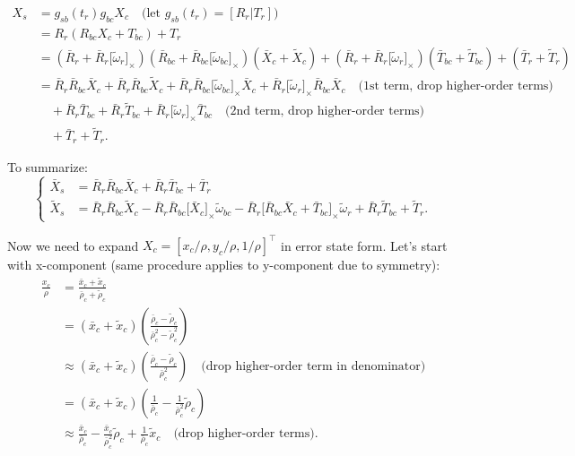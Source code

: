 \documentclass[letter,10pt]{article}
\newcommand{\asym}[1]{{\lbrack #1\rbrack}_\times{}}
\begin{document}
\begin{equation}
\begin{aligned}
X_s &= g_{sb}(t_r) g_{bc} X_c \quad\text{(let } g_{sb}(t_r)=[R_r|T_r] \text{)}\\
&= R_r(R_{bc} X_c + T_{bc}) + T_r \\ 
&= (\bar R_r + \bar R_r \asym{\tilde \omega_r})(\bar R_{bc} + \bar R_{bc}\asym{\tilde \omega_{bc}})(\bar X_c + \tilde X_c) + (\bar R_r + \bar R_r \asym{\tilde \omega_r})(\bar T_{bc} + \tilde T_{bc}) + (\bar T_r + \tilde T_r) \\
&= \bar R_r \bar R_{bc} \bar X_c  + 
\bar R_r \bar R_{bc} \tilde X_c +
\bar R_r \bar R_{bc} \asym{\tilde\omega_{bc}} \bar X_c +
\bar R_r \asym{\tilde \omega_r} \bar R_{bc} \bar X_c \quad\text{(1st term, drop higher-order terms)}\\
&\quad + \bar R_r \bar T_{bc} + \bar R_r \tilde T_{bc} + \bar R_r \asym{\tilde\omega_r} \bar T_{bc} \quad\text{(2nd term, drop higher-order terms)}\\
&\quad + \bar T_r + \tilde T_r.
\end{aligned}
\end{equation}

To summarize:
\begin{equation}
\begin{cases}
\bar X_s &= \bar R_r \bar R_{bc} \bar X_c + \bar R_r \bar T_{bc} + \bar T_r\\
\tilde X_s &= \bar R_r \bar R_{bc} \tilde X_c - \bar R_r \bar R_{bc} \asym{\bar X_c} \tilde \omega_{bc} - \bar R_r \asym{\bar R_{bc} \bar X_c + \bar T_{bc}} \tilde \omega_r + \bar R_r \tilde T_{bc} + \tilde T_r.
\end{cases}
\end{equation}

Now we need to expand $X_c = [x_c/\rho, y_c/\rho, 1/\rho]^\top$ in error state form. Let's start with x-component (same procedure applies to y-component due to symmetry):
\begin{equation}
\begin{aligned}
\frac{x_c}{\rho}
&= \frac{\bar x_c + \tilde x_c}{\bar \rho_c + \tilde \rho_c} \\
&= (\bar x_c + \tilde x_c) \left (  \frac{\bar \rho_c - \tilde \rho_c}{\bar \rho_c^2 - \tilde \rho_c^2}  \right ) \\
&\approx (\bar x_c + \tilde x_c) \left (  \frac{\bar \rho_c - \tilde \rho_c}{\bar \rho_c^2}  \right ) \quad\text{(drop higher-order term in denominator)}\\
&= (\bar x_c + \tilde x_c)\left (\frac{1}{\bar \rho_c} - \frac{1}{\bar \rho_c^2}\tilde \rho_c \right )\\
&\approx \frac{\bar x_c}{\bar\rho_c} - \frac{\bar x_c}{\bar \rho_c^2} \tilde\rho_c + \frac{1}{\bar \rho_c} \tilde x_c \quad\text{(drop higher-order terms)}.
\end{aligned}
\end{equation}
\end{document}
